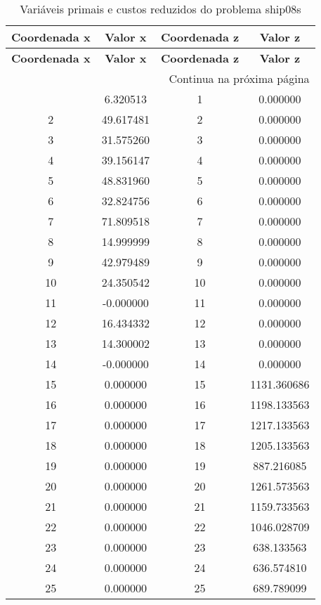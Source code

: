 \documentclass[12pt]{article}
\begin{document}
\begin{longtable}{@{}cccc@{}}
\caption{Variáveis primais e custos reduzidos do problema ship08s} \\
\toprule
\textbf{Coordenada x} & \textbf{Valor x} & \textbf{Coordenada z} & \textbf{Valor z} \\
\midrule
\endfirsthead

\toprule
\textbf{Coordenada x} & \textbf{Valor x} & \textbf{Coordenada z} & \textbf{Valor z} \\
\midrule
\endhead

\midrule \multicolumn{4}{r}{{Continua na próxima página}} \\ \midrule
\endfoot

\bottomrule
\endlastfoot
1 & 6.320513 & 1 & 0.000000 \\
2 & 49.617481 & 2 & 0.000000 \\
3 & 31.575260 & 3 & 0.000000 \\
4 & 39.156147 & 4 & 0.000000 \\
5 & 48.831960 & 5 & 0.000000 \\
6 & 32.824756 & 6 & 0.000000 \\
7 & 71.809518 & 7 & 0.000000 \\
8 & 14.999999 & 8 & 0.000000 \\
9 & 42.979489 & 9 & 0.000000 \\
10 & 24.350542 & 10 & 0.000000 \\
11 & -0.000000 & 11 & 0.000000 \\
12 & 16.434332 & 12 & 0.000000 \\
13 & 14.300002 & 13 & 0.000000 \\
14 & -0.000000 & 14 & 0.000000 \\
15 & 0.000000 & 15 & 1131.360686 \\
16 & 0.000000 & 16 & 1198.133563 \\
17 & 0.000000 & 17 & 1217.133563 \\
18 & 0.000000 & 18 & 1205.133563 \\
19 & 0.000000 & 19 & 887.216085 \\
20 & 0.000000 & 20 & 1261.573563 \\
21 & 0.000000 & 21 & 1159.733563 \\
22 & 0.000000 & 22 & 1046.028709 \\
23 & 0.000000 & 23 & 638.133563 \\
24 & 0.000000 & 24 & 636.574810 \\
25 & 0.000000 & 25 & 689.789099 \\

\end{longtable}
\end{document}
